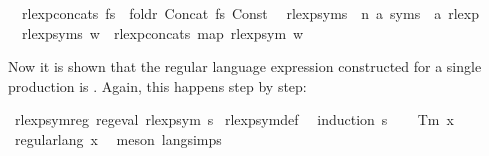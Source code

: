 \begin{isabellebody}
\ \ {\isachardoublequoteopen}rlexp{\isacharunderscore}{\kern0pt}concats\ fs\ {\isacharequal}{\kern0pt}\ foldr\ Concat\ fs\ {\isacharparenleft}{\kern0pt}Const\ {\isacharbraceleft}{\kern0pt}{\isacharbrackleft}{\kern0pt}{\isacharbrackright}{\kern0pt}{\isacharbraceright}{\kern0pt}{\isacharparenright}{\kern0pt}{\isachardoublequoteclose}\isanewline
\isanewline
{}\isamarkupfalse%
\ rlexp{\isacharunderscore}{\kern0pt}syms\ {\isacharcolon}{\kern0pt}{\isacharcolon}{\kern0pt}\ {\isachardoublequoteopen}{\isacharparenleft}{\kern0pt}{\isacharprime}{\kern0pt}n{\isacharcomma}{\kern0pt}\ {\isacharprime}{\kern0pt}a{\isacharparenright}{\kern0pt}\ syms\ {\isasymRightarrow}\ {\isacharprime}{\kern0pt}a\ rlexp{\isachardoublequoteclose}\ \isanewline
\ \ {\isachardoublequoteopen}rlexp{\isacharunderscore}{\kern0pt}syms\ w\ {\isacharequal}{\kern0pt}\ rlexp{\isacharunderscore}{\kern0pt}concats\ {\isacharparenleft}{\kern0pt}map\ rlexp{\isacharunderscore}{\kern0pt}sym\ w{\isacharparenright}{\kern0pt}{\isachardoublequoteclose}%
\begin{isamarkuptext}%
Now it is shown that the regular language expression constructed for a single production
is . Again, this happens step by step:%
\end{isamarkuptext}\isamarkuptrue%
\isamarkupfalse%
\ rlexp{\isacharunderscore}{\kern0pt}sym{\isacharunderscore}{\kern0pt}reg{\isacharcolon}{\kern0pt}\ {\isachardoublequoteopen}reg{\isacharunderscore}{\kern0pt}eval\ {\isacharparenleft}{\kern0pt}rlexp{\isacharunderscore}{\kern0pt}sym\ s{\isacharparenright}{\kern0pt}{\isachardoublequoteclose}\isanewline
%
\isadelimproof
%
\endisadelimproof
%
\isatagproof
{}\isamarkupfalse%
\ rlexp{\isacharunderscore}{\kern0pt}sym{\isacharunderscore}{\kern0pt}def\ \isamarkupfalse%
\ {\isacharparenleft}{\kern0pt}induction\ s{\isacharparenright}{\kern0pt}\isanewline
\ \ \isamarkupfalse%
\ {\isacharparenleft}{\kern0pt}Tm\ x{\isacharparenright}{\kern0pt}\isanewline
\ \ \isamarkupfalse%
\ {\isachardoublequoteopen}regular{\isacharunderscore}{\kern0pt}lang\ {\isacharbraceleft}{\kern0pt}{\isacharbrackleft}{\kern0pt}x{\isacharbrackright}{\kern0pt}{\isacharbraceright}{\kern0pt}{\isachardoublequoteclose}\ \isamarkupfalse%
\ {\isacharparenleft}{\kern0pt}meson\ lang{\isachardot}{\kern0pt}simps{\isacharparenleft}{\kern0pt}{}{\isacharparenright}{\kern0pt}{\isacharparenright}{\kern0pt}\isanewline

\end{isabellebody}
